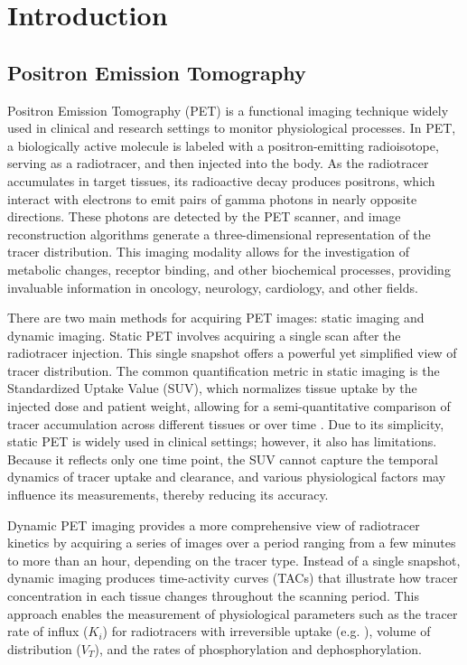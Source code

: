 \chapter{Introduction}
\section{Positron Emission Tomography}
Positron Emission Tomography (PET) is a functional imaging technique widely used in clinical and research settings to monitor physiological processes.
In PET, a biologically active molecule is labeled with a positron-emitting radioisotope, serving as a radiotracer, and then injected into the body.
As the radiotracer accumulates in target tissues, its radioactive decay produces positrons, which interact with electrons to emit pairs of gamma photons in nearly opposite directions.
These photons are detected by the PET scanner, and image reconstruction algorithms generate a three-dimensional representation of the tracer distribution.
This imaging modality allows for the investigation of metabolic changes, receptor binding, and other biochemical processes, providing invaluable information in oncology, neurology, cardiology, and other fields.

There are two main methods for acquiring PET images: static imaging and dynamic imaging.
Static PET involves acquiring a single scan after the radiotracer injection.
This single snapshot offers a powerful yet simplified view of tracer distribution.
The common quantification metric in static imaging is the Standardized Uptake Value (SUV), which normalizes tissue uptake by the injected dose and patient weight, allowing for a semi-quantitative comparison of tracer accumulation across different tissues or over time \cite{keyes1995suv}.
Due to its simplicity, static PET is widely used in clinical settings; however, it also has limitations.
Because it reflects only one time point, the SUV cannot capture the temporal dynamics of tracer uptake and clearance, and various physiological factors may influence its measurements, thereby reducing its accuracy.

Dynamic PET imaging provides a more comprehensive view of radiotracer kinetics by acquiring a series of images over a period ranging from a few minutes to more than an hour, depending on the tracer type.
Instead of a single snapshot, dynamic imaging produces time-activity curves (TACs) that illustrate how tracer concentration in each tissue changes throughout the scanning period.
This approach enables the measurement of physiological parameters such as the tracer rate of influx (\(K_i\)) for radiotracers with irreversible uptake (e.g. \fdg ), volume of distribution (\(V_T\)), and the rates of phosphorylation and dephosphorylation.

